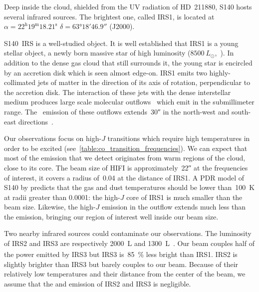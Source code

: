 Deep inside the cloud, shielded from the UV radiation of HD~211880, S140 hosts several infrared sources.
The brightest one, called IRS1, is located at $\alpha = 22^\text{h} 19^\text{m} 18.21^\text{s}$ $\delta = \ang{63;18;46.9}$ (J2000).

S140~IRS is a well-studied object.
It is well established that IRS1 is a young stellar object, a newly born massive star of high luminosity ($\SI{8500}{L_\odot}$,~\cite{maud2013s140}).
In addition to the dense gas cloud that still surrounds it, the young star is encircled by an accretion disk which is seen almost edge-on.
IRS1 emits two highly-collimated jets of matter in the direction of its axis of rotation, perpendicular to the accretion disk.
The interaction of these jets with the dense interstellar medium produces large scale molecular outflows~\parencite{reipurth2001herbig} which emit in the submillimeter range.
The~ emission of these outflows extends~\ang{;;30} in the north-west and south-east directions~\parencite{maud2013s140}.

Our observations focus on high-$J$ transitions which require high temperatures in order to be excited (see~\cref{table:co_transition_frequencies}).
We can expect that most of the emission that we detect originates from warm regions of the cloud, close to its core.
The beam size of HIFI is approximately~\ang{;;22} at the frequencies of interest,
it covers a radius of~\SI{0.04}{\parsec} at the distance of IRS1.
A PDR model of S140 by \textcite{koumpia2015} predicts that the gas and dust temperatures should be lower than~\SI{100}{\kelvin} at radii greater than \SI{0.0001}{\parsec}: the high-$J$  core of IRS1 is much smaller than the beam size.
Likewise, the high-$J$  emission in the outflow extends much less than the  emission, bringing our region of interest well inside our beam size.

Two nearby infrared sources could contaminate our observations.
The luminosity of IRS2 and IRS3 are respectively \SI{2000}{L_\odot} and \SI{1300}{L_\odot}~\parencite{koumpia2015}.
Our beam couples half of the power emitted by IRS3 but IRS3 is~\SI{85}{\percent} less bright than IRS1.
IRS2 is slightly brighter than IRS3 but barely couples to our beam.
Because of their relatively low temperatures and their distance from the center of the beam, we assume that the  and  emission of IRS2 and IRS3 is negligible.

